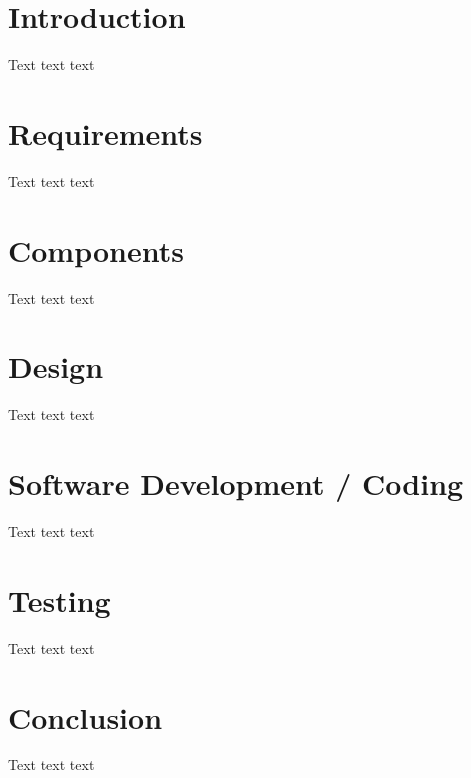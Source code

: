 \documentclass[12pt]{article}
\begin{document}
\clearpage
\singlespacing
\tableofcontents  %
\clearpage
\listoffigures    %
\listoftables     %
\listofalgorithms %
\clearpage
\onehalfspacing

\section{Introduction}
Text text text 

\section{Requirements}
Text text text

\section{Components}
Text text text

\section{Design}
Text text text

\section{Software Development / Coding}
Text text text

\section{Testing}
Text text text

\section{Conclusion}
Text text text


\clearpage
{}
\singlespacing %
\printbibliography
\end{document}
